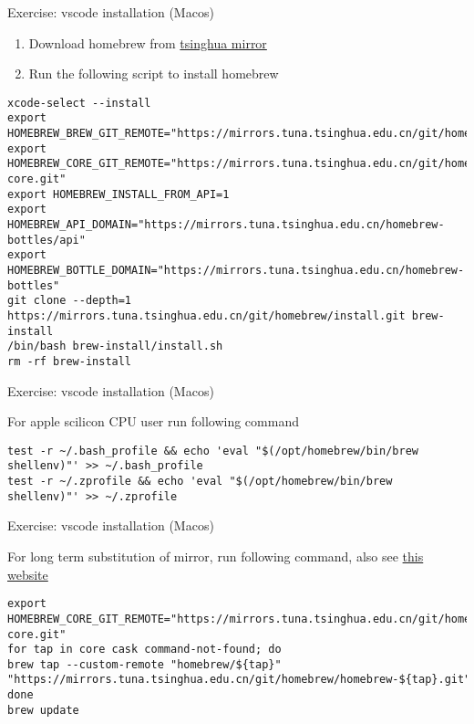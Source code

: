 \begin{frame}[fragile]{Exercise: vscode installation (Macos)}
	\begin{enumerate}
		\item Download homebrew from \href{https://mirrors.tuna.tsinghua.edu.cn/help/homebrew/}{tsinghua mirror}
		\item Run the following script to install homebrew
	\end{enumerate}
	\begin{verbatim}
xcode-select --install
export HOMEBREW_BREW_GIT_REMOTE="https://mirrors.tuna.tsinghua.edu.cn/git/homebrew/brew.git"
export HOMEBREW_CORE_GIT_REMOTE="https://mirrors.tuna.tsinghua.edu.cn/git/homebrew/homebrew-core.git"
export HOMEBREW_INSTALL_FROM_API=1
export HOMEBREW_API_DOMAIN="https://mirrors.tuna.tsinghua.edu.cn/homebrew-bottles/api"
export HOMEBREW_BOTTLE_DOMAIN="https://mirrors.tuna.tsinghua.edu.cn/homebrew-bottles"
git clone --depth=1 https://mirrors.tuna.tsinghua.edu.cn/git/homebrew/install.git brew-install
/bin/bash brew-install/install.sh
rm -rf brew-install
	\end{verbatim}
\end{frame}

\begin{frame}[fragile]{Exercise: vscode installation (Macos)}

	For apple scilicon CPU user run following command

	\begin{verbatim}
test -r ~/.bash_profile && echo 'eval "$(/opt/homebrew/bin/brew shellenv)"' >> ~/.bash_profile
test -r ~/.zprofile && echo 'eval "$(/opt/homebrew/bin/brew shellenv)"' >> ~/.zprofile
	\end{verbatim}

\end{frame}

\begin{frame}[fragile]{Exercise: vscode installation (Macos)}

For long term substitution of mirror, run following command, also see \href{https://mirrors.tuna.tsinghua.edu.cn/help/homebrew-bottles/}{this website}

	\begin{verbatim}
export HOMEBREW_CORE_GIT_REMOTE="https://mirrors.tuna.tsinghua.edu.cn/git/homebrew/homebrew-core.git"
for tap in core cask command-not-found; do
brew tap --custom-remote "homebrew/${tap}" "https://mirrors.tuna.tsinghua.edu.cn/git/homebrew/homebrew-${tap}.git"
done
brew update
	\end{verbatim}
\end{frame}

